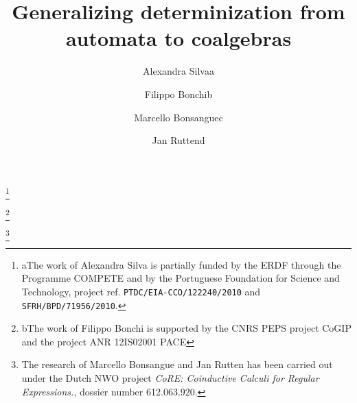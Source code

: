 \documentclass{LMCS}
\begin{document}
\title{Generalizing determinization from automata to coalgebras}


\author[A.~Silva]{Alexandra Silva\rsuper a}   \address{{\lsuper a}Radboud University Nijmegen and Centrum Wiskunde \& Informatica}   \thanks{{\lsuper a}The work of Alexandra Silva is partially funded by the ERDF through the Programme COMPETE and by the Portuguese Foundation for Science and
Technology, project ref. \texttt{PTDC/EIA-CCO/122240/2010} and \texttt{SFRH/BPD/71956/2010}.
}

\author[F.~Bonchi]{Filippo Bonchi\rsuper b}   \address{{\lsuper b}ENS Lyon, Universit\'{e} de Lyon, LIP (UMR 5668 CNRS ENS Lyon UCBL INRIA)}   \thanks{{\lsuper b}The work of Filippo Bonchi is supported by the CNRS PEPS project CoGIP and the project ANR 12IS02001 PACE}   

\author[M.~Bonsangue]{Marcello Bonsangue\rsuper c}   \address{{\lsuper c}LIACS - Leiden University}   

\author[J.~Rutten]{Jan Rutten\rsuper d}   \address{{\lsuper d}Centrum Wiskunde \& Informatica and Radboud University Nijmegen}   \thanks{{}The research of Marcello Bonsangue and Jan Rutten has been carried out under the Dutch NWO project {\em CoRE: Coinductive Calculi for Regular Expressions.},
dossier number 612.063.920.}   


\end{document}
